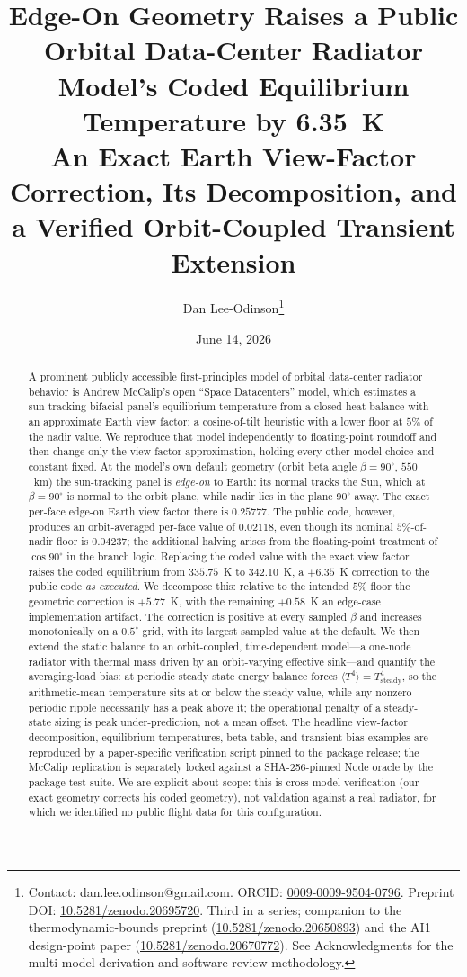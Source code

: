 \documentclass[11pt]{article}
\title{Edge-On Geometry Raises a Public Orbital Data-Center Radiator Model's
Coded Equilibrium Temperature by 6.35~K\\[2pt]
\large An Exact Earth View-Factor Correction, Its Decomposition, and a Verified
Orbit-Coupled Transient Extension}
\author{Dan Lee-Odinson\thanks{Contact: dan.lee.odinson@gmail.com. ORCID:
\href{https://orcid.org/0009-0009-9504-0796}{0009-0009-9504-0796}. Preprint DOI: \href{https://doi.org/10.5281/zenodo.20695720}{10.5281/zenodo.20695720}. Third in a
series; companion to the thermodynamic-bounds preprint
(\href{https://doi.org/10.5281/zenodo.20650893}{10.5281/zenodo.20650893}) and the
AI1 design-point paper
(\href{https://doi.org/10.5281/zenodo.20670772}{10.5281/zenodo.20670772}). See
Acknowledgments for the multi-model derivation and software-review methodology.}}
\date{June 14, 2026}
\theoremstyle{remark}
\begin{document}
\maketitle

\begin{abstract}
A prominent publicly accessible first-principles model of orbital data-center
radiator behavior is Andrew McCalip's open ``Space Datacenters'' model, which
estimates a sun-tracking bifacial panel's equilibrium temperature from a closed
heat balance with an approximate Earth view factor: a cosine-of-tilt heuristic
with a lower floor at $5\%$ of the nadir value. We reproduce that model
independently to floating-point roundoff and then change only the
view-factor approximation, holding every other model choice and constant fixed.
At the model's own default geometry (orbit beta angle $\beta=90^{\circ}$,
$550$~km) the sun-tracking panel is \emph{edge-on} to Earth: its normal tracks
the Sun, which at $\beta=90^{\circ}$ is normal to the orbit plane, while nadir
lies in the plane $90^{\circ}$ away. The exact per-face edge-on Earth view factor
there is $0.25777$. The public code, however, produces an orbit-averaged per-face
value of $0.02118$, even though its nominal $5\%$-of-nadir floor is $0.04237$; the
additional halving arises from the floating-point treatment of $\cos 90^{\circ}$
in the branch logic. Replacing the coded value with the exact view factor raises
the coded equilibrium from $335.75$~K to $342.10$~K, a $+6.35$~K correction to the
public code \emph{as executed}. We decompose this: relative to the intended $5\%$
floor the geometric correction is $+5.77$~K, with the remaining $+0.58$~K an
edge-case implementation artifact. The correction is positive at every sampled
$\beta$ and increases monotonically on a $0.5^{\circ}$ grid, with its largest
sampled value at the default. We then extend the
static balance to an orbit-coupled, time-dependent model---a one-node radiator
with thermal mass driven by an orbit-varying effective sink---and quantify the
averaging-load bias: at periodic steady state energy balance forces
$\langle T^{4}\rangle = T_{\mathrm{steady}}^{4}$, so the arithmetic-mean
temperature sits at or below the steady value, while any nonzero periodic ripple
necessarily has a peak above it; the operational penalty of a steady-state sizing
is peak under-prediction, not a mean offset. The headline view-factor
decomposition, equilibrium temperatures, beta table, and transient-bias examples
are reproduced by a paper-specific verification script pinned to the package
release; the McCalip replication is separately locked against a SHA-256-pinned
Node oracle by the package test suite. We are explicit about scope: this is
cross-model verification
(our exact geometry corrects his coded geometry), not validation against a real
radiator, for which we identified no public flight data for this configuration.
\end{abstract}
\end{document}
